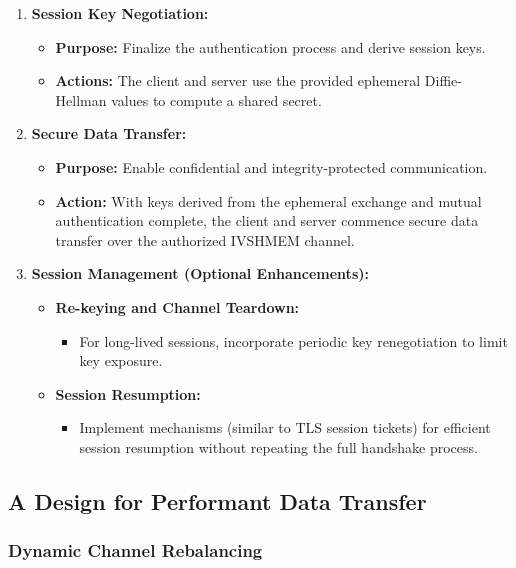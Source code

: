 \documentclass[letterpaper,twocolumn,10pt]{article}
\begin{document}
\begin{enumerate}[label=\arabic*.]
  \item \textbf{Session Key Negotiation:}
    \begin{itemize}
      \item \textbf{Purpose:} Finalize the authentication process and derive session keys.
      \item \textbf{Actions:} The client and server use the provided ephemeral Diffie-Hellman values to compute a shared secret.
    \end{itemize}
    
  \item \textbf{Secure Data Transfer:}
    \begin{itemize}
      \item \textbf{Purpose:} Enable confidential and integrity-protected communication.
      \item \textbf{Action:} With keys derived from the ephemeral exchange and mutual authentication complete, the client and server commence secure data transfer over the authorized IVSHMEM channel.
    \end{itemize}
    
  \item \textbf{Session Management (Optional Enhancements):}
    \begin{itemize}
      \item \textbf{Re-keying and Channel Teardown:}
        \begin{itemize}
          \item For long-lived sessions, incorporate periodic key renegotiation to limit key exposure.
        \end{itemize}
      \item \textbf{Session Resumption:}
        \begin{itemize}
          \item Implement mechanisms (similar to TLS session tickets) for efficient session resumption without repeating the full handshake process.
        \end{itemize}
    \end{itemize}
\end{enumerate}



\subsection{A Design for Performant Data Transfer}

\subsubsection{Dynamic Channel Rebalancing}
\end{document}
